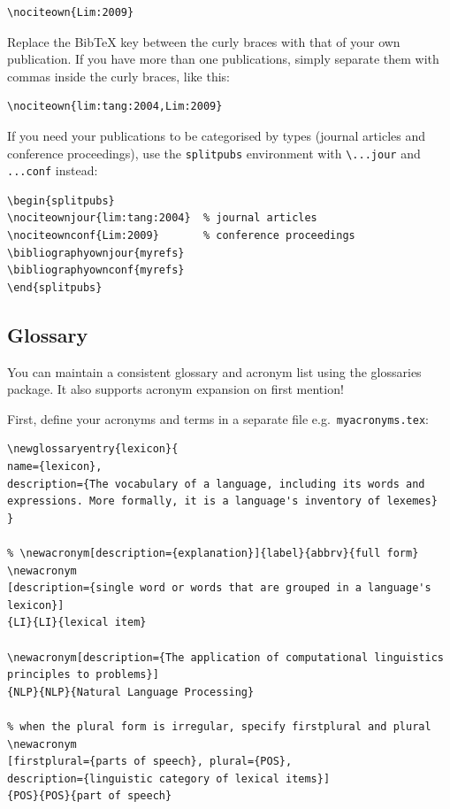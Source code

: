\begin{lstlisting}
\nociteown{Lim:2009}
\end{lstlisting}

Replace the BibTeX key between the curly braces with that of your own publication.  If you have more than one publications, simply separate them with commas inside the curly braces, like this:

\begin{lstlisting}
\nociteown{lim:tang:2004,Lim:2009}
\end{lstlisting}

If you need your publications to be categorised by types (journal articles and conference proceedings), use the \texttt{splitpubs} environment with \verb=\...jour= and \verb=...conf= instead:

\begin{lstlisting}[keepspaces=true,moretexcs={\nociteownjour,\nociteownconf,\bibliographyownjour,\bibliographyownconf},emph={splitpubs},emphstyle={\bfseries}]
\begin{splitpubs}
\nociteownjour{lim:tang:2004}  % journal articles
\nociteownconf{Lim:2009}       % conference proceedings
\bibliographyownjour{myrefs}
\bibliographyownconf{myrefs}
\end{splitpubs}
\end{lstlisting}


\subsection{Glossary}\label{sec:glossary}
You can maintain a consistent glossary and acronym list using the \textsf{glossaries} package. It also supports acronym expansion on first mention!

First, define your acronyms and terms in a separate file e.g.~\texttt{myacronyms.tex}:


\begin{lstlisting}[moretexcs={newacronym,newglossaryentry},
emph={name,description,plural,firstplural},emphstyle=\bfseries]
% \newglossaryentry{label}{name={term},description={explanation}}
\newglossaryentry{lexicon}{
name={lexicon},
description={The vocabulary of a language, including its words and expressions. More formally, it is a language's inventory of lexemes}
}

% \newacronym[description={explanation}]{label}{abbrv}{full form}
\newacronym
[description={single word or words that are grouped in a language's lexicon}]
{LI}{LI}{lexical item}

\newacronym[description={The application of computational linguistics principles to problems}]
{NLP}{NLP}{Natural Language Processing}

% when the plural form is irregular, specify firstplural and plural
\newacronym
[firstplural={parts of speech}, plural={POS},
description={linguistic category of lexical items}]
{POS}{POS}{part of speech}
\end{lstlisting}



